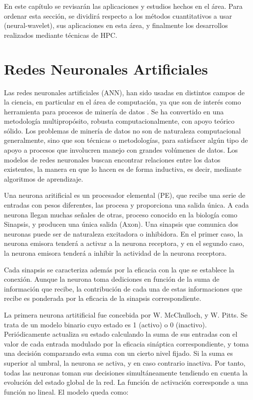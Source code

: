 En este capítulo se revisarán las aplicaciones y estudios hechos en el área.
Para ordenar esta sección, se dividirá respecto a los métodos cuantitativos a
usar (neural-wavelet), sus aplicaciones en esta área, y finalmente los
desarrollos realizados mediante técnicas de HPC.

\section{Redes Neuronales Artificiales}

Las redes neuronales artificiales (ANN), han sido usadas en distintos campos de
la ciencia, en particular en el área de computación, ya que son de interés como
herramienta para procesos de minería de datos \cite{bigus1996data}. Se ha
convertido en una metodología multipropósito, robusta computacionalmente, con
apoyo teórico sólido. Los problemas de minería de datos no son de naturaleza
computacional generalmente, sino que son técnicas o metodologías, para
satisfacer algún tipo de apoyo a procesos que involucren manejo con grandes
volúmenes de datos. Los modelos de redes neuronales buscan encontrar relaciones
entre los datos existentes, la manera en que lo hacen es de forma inductiva, es
decir, mediante algoritmos de aprendizaje.

Una neurona aritificial es un procesador elemental (PE), que recibe una serie
de entradas con pesos diferentes, las procesa y proporciona una salida única. A
cada neurona llegan muchas señales de otras, proceso conocido en la biología
como Sinapsis, y producen una única salida (Axon). Una sinapsis que comunica dos
neuronas puede ser de naturaleza excitadora o inhibidora. En el primer caso, la
neurona emisora tenderá a activar a la neurona receptora, y en el segundo caso,
la neurona emisora tenderá a inhibir la actividad de la neurona receptora.

Cada sinapsis se caracteriza además por la eficacia con la que se establece la
conexión. Aunque la neurona toma dediciones en función de la suma de
información que recibe, la contribución de cada una de estas informaciones que
recibe es ponderada por la eficacia de la sinapsis correspondiente.

La primera neurona artitificial fue concebida por W. McChulloch, y W. Pitts. Se
trata de un modelo binario cuyo estado es 1 (activo) o 0 (inactivo).
Periódicamente actualiza su estado calculando la suma de sus entradas con el
valor de cada entrada modulado por la eficacia sináptica correspondiente, y
toma una decisión comparando esta suma con un cierto nivel fijado. Si la suma
es superior al umbral, la neurona se activa, y en caso contrario inactiva. Por
tanto, todas las neuronas toman sus decisiones simultáneamente tendiendo en
cuenta la evolución del estado global de la red. La función de activación
corresponde a una función no lineal. El modelo queda como:


